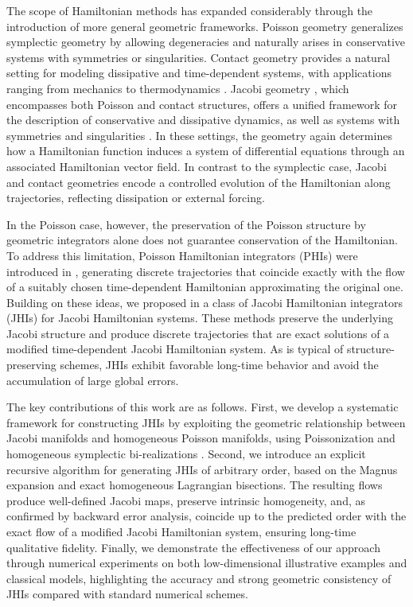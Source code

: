 \documentclass[12pt,english]{article}
\begin{document}
The scope of Hamiltonian methods has expanded considerably through the introduction of more general geometric frameworks. Poisson geometry \cite{crainic2021lectures,Weinstein1983} generalizes symplectic geometry by allowing degeneracies and naturally arises in conservative systems with symmetries or singularities. Contact geometry provides a natural setting for modeling dissipative and time-dependent systems, with applications ranging from mechanics to thermodynamics \cite{Bravetti_19,Bravetti_2017,deLeonSardon2017,MRUGALA1991109}. Jacobi geometry \cite{BruceGrabowskaGrabowski2017,Kirillov,LICHNEROWICZ1977}, which encompasses both Poisson and contact structures, offers a unified framework for the description of conservative and dissipative dynamics, as well as systems with symmetries and singularities \cite{deLeonetal2023,LiuZhang2011,SardondeLucasHerranz2015,ZapataPhD,Zapata2020}. In these settings, the geometry again determines how a Hamiltonian function induces a system of differential equations through an associated Hamiltonian vector field. In contrast to the symplectic case, Jacobi and contact geometries encode a controlled evolution of the Hamiltonian along trajectories, reflecting dissipation or external forcing.

In the Poisson case, however, the preservation of the Poisson structure by geometric integrators alone does not guarantee conservation of the Hamiltonian. To address this limitation, Poisson Hamiltonian integrators (PHIs) were introduced in \cite{COSSERAT2023}, generating discrete trajectories that coincide exactly with the flow of a suitably chosen time-dependent Hamiltonian approximating the original one. Building on these ideas, we proposed in \cite{araujo2025jacobihamiltonianintegrators} a class of Jacobi Hamiltonian integrators (JHIs) for Jacobi Hamiltonian systems. These methods preserve the underlying Jacobi structure and produce discrete trajectories that are exact solutions of a modified time-dependent Jacobi Hamiltonian system. As is typical of structure-preserving schemes, JHIs exhibit favorable long-time behavior and avoid the accumulation of large global errors.

The key contributions of this work are as follows. First, we develop a systematic framework for constructing JHIs by exploiting the geometric relationship between Jacobi manifolds and homogeneous Poisson manifolds, using Poissonization and homogeneous symplectic bi-realizations \cite{Monica_Blaga_2020,CMS2022,CrainicMarcut2011,CrainicZhu2004}. Second, we introduce an explicit recursive algorithm for generating JHIs of arbitrary order, based on the Magnus expansion and exact homogeneous Lagrangian bisections. The resulting flows produce well-defined Jacobi maps, preserve intrinsic homogeneity, and, as confirmed by backward error analysis, coincide up to the predicted order with the exact flow of a modified Jacobi Hamiltonian system, ensuring long-time qualitative fidelity. Finally, we demonstrate the effectiveness of our approach through numerical experiments on both low-dimensional illustrative examples and classical models, highlighting the accuracy and strong geometric consistency of JHIs compared with standard numerical schemes.
\end{document}
